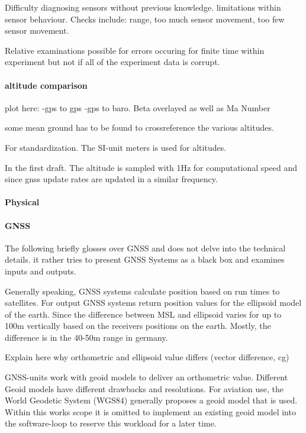 Difficulty diagnosing sensors without previous knowledge. limitations within sensor behaviour. Checks include: range, too much sensor movement, too few sensor movement.

Relative examinations possible for errors occuring for finite time within experiment but not if all of the experiment data is corrupt.

\paragraph{altitude comparison}

plot here:
-gps to gps
-gps to baro. Beta overlayed as well as Ma Number


some mean ground has to be found to crossreference the various altitudes.

For standardization. The SI-unit meters is used for altitudes.

In the first draft. The altitude is sampled with 1Hz for computational speed and since gnss update rates are updated in a similar frequency.

\paragraph{ Physical}

\paragraph{ GNSS}

The following briefly glosses over GNSS and does not delve into the technical details. it rather tries to present GNSS Systems as a black box and examines inputs and outputs.

Generally speaking, GNSS systems calculate position based on run times to satellites. For output GNSS systems return position values for the ellipsoid model of the earth. Since the difference between MSL and ellipsoid varies for up to 100m vertically based on the receivers positions on the earth. Mostly, the difference is in the 40-50m range in germany.

Explain here why orthometric and ellipsoid value differs (vector difference, cg)

GNSS-units work with geoid models to deliver an orthometric value. Different Geoid models have different drawbacks and resolutions. For aviation use, the World Geodetic System (WGS84) generally proposes a geoid model that is used. Within this works scope it is omitted to implement an existing geoid model into the software-loop to reserve this workload for a later time.


